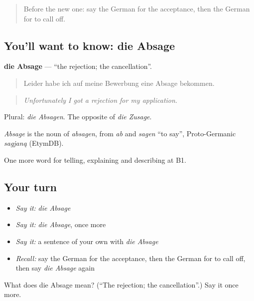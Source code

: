 \begin{quote}
Before the new one: say the German for the acceptance, then the German for to call off.
\end{quote}

\subsection*{You'll want to know: die Absage}
\textbf{die Absage} — \textquotedblleft{}the rejection; the cancellation\textquotedblright{}.

\begin{quote}
Leider habe ich auf meine Bewerbung eine Absage bekommen.
\end{quote}

\begin{quote}
\emph{Unfortunately I got a rejection for my application.}
\end{quote}

Plural: \emph{die Absagen}. The opposite of \emph{die Zusage}.

\begin{cousinweb}
\emph{Absage} is the noun of \emph{absagen}, from \emph{ab} and \emph{sagen} \textquotedblleft{}to say\textquotedblright{}, Proto-Germanic \emph{sagjaną} (EtymDB).
\end{cousinweb}

\begin{grammarlens}[title={What you've built}]
One more word for telling, explaining and describing at B1.
\end{grammarlens}

\subsection*{Your turn}
\begin{itemize}
\raggedright
  \item \emph{Say it:} \emph{die Absage}
  \item \emph{Say it:} \emph{die Absage}, once more
  \item \emph{Say it:} a sentence of your own with \emph{die Absage}
  \item \emph{Recall:} say the German for the acceptance, then the German for to call off, then say \emph{die Absage} again
\end{itemize}

\begin{tcolorbox}[breakable,colback=teal!4,colframe=teal!35!black,title={Before you move on}]
What does die Absage mean? (\textquotedblleft{}The rejection; the cancellation\textquotedblright{}.) Say it once more.
\end{tcolorbox}
